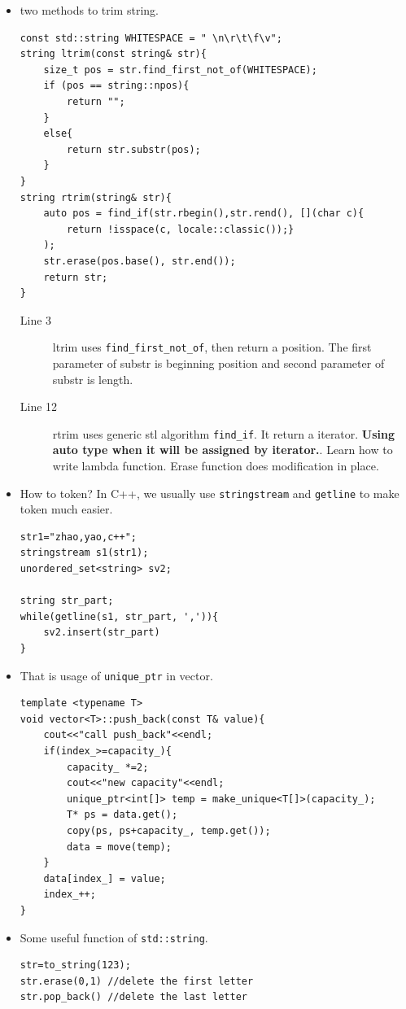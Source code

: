 \documentclass[a4paper,11pt,twoside]{book}
\begin{document}
\begin{itemize}
	\item two methods to trim string.

\begin{lstlisting}[]
const std::string WHITESPACE = " \n\r\t\f\v";
string ltrim(const string& str){
	size_t pos = str.find_first_not_of(WHITESPACE);
	if (pos == string::npos){
		return "";
	}
	else{
		return str.substr(pos);
	}
}
string rtrim(string& str){
	auto pos = find_if(str.rbegin(),str.rend(), [](char c){ 
		return !isspace(c, locale::classic());}
	);
	str.erase(pos.base(), str.end());
	return str;
}
\end{lstlisting}
\begin{description}
	\item[Line 3] ltrim uses \texttt{find\_first\_not\_of}, then return a position. The first parameter of substr is beginning position and second parameter of substr is length. 
	
	\item[Line 12] rtrim uses generic stl algorithm \texttt{find\_if}. It return a iterator. \textbf{Using auto type when it will be assigned by iterator.}. Learn how to write lambda function.  Erase function does modification in place. 
\end{description}

\item How to token? In C++, we usually use \texttt{stringstream} and \texttt{getline} to make token much easier.
\begin{lstlisting}[numbers=none]
str1="zhao,yao,c++";
stringstream s1(str1);
unordered_set<string> sv2;

string str_part;
while(getline(s1, str_part, ',')){
	sv2.insert(str_part)
}	
\end{lstlisting}


\item That is usage of \texttt{unique\_ptr} in vector. 

\begin{lstlisting}[numbers=none]
template <typename T>
void vector<T>::push_back(const T& value){
	cout<<"call push_back"<<endl;
	if(index_>=capacity_){
		capacity_ *=2;
		cout<<"new capacity"<<endl;
		unique_ptr<int[]> temp = make_unique<T[]>(capacity_);
		T* ps = data.get();
		copy(ps, ps+capacity_, temp.get());
		data = move(temp);
	}
	data[index_] = value;
	index_++;
}
\end{lstlisting}


\item Some useful function of \texttt{std::string}.
\begin{lstlisting}[numbers=none]
str=to_string(123);
str.erase(0,1) //delete the first letter
str.pop_back() //delete the last letter
\end{lstlisting}


\end{itemize}
\end{document}
